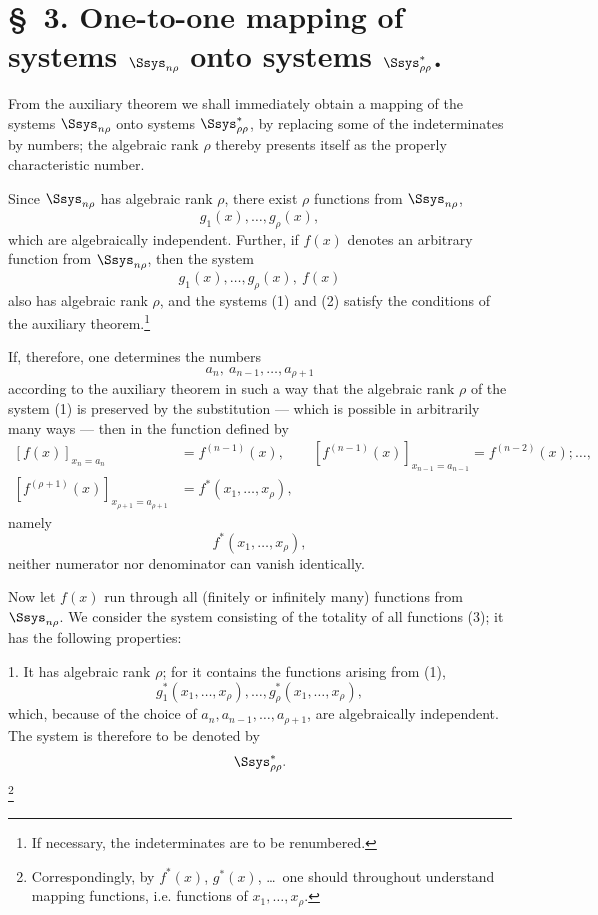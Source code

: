 \documentclass[11pt]{article}
\begin{document}
\section*{\S\ 3. One-to-one mapping of systems $\Ssys_{n\rho}$ onto systems $\Ssys^*_{\rho\rho}$.}

From the auxiliary theorem we shall immediately obtain a mapping of the systems $\Ssys_{n\rho}$ onto systems $\Ssys^*_{\rho\rho}$, by replacing some of the indeterminates by numbers; the algebraic rank $\rho$ thereby presents itself as the properly characteristic number.

Since $\Ssys_{n\rho}$ has algebraic rank $\rho$, there exist $\rho$ functions from $\Ssys_{n\rho}$,
\begin{equation}
  g_1(x),\ldots,g_\rho(x),
\tag{1}
\end{equation}
which are algebraically independent. Further, if $f(x)$ denotes an arbitrary function from $\Ssys_{n\rho}$, then the system
\begin{equation}
  g_1(x),\ldots,g_\rho(x),\ f(x)
\tag{2}
\end{equation}
also has algebraic rank $\rho$, and the systems (1) and (2) satisfy the conditions of the auxiliary theorem.\footnote{If necessary, the indeterminates are to be renumbered.}

If, therefore, one determines the numbers
\[
  a_n,\ a_{n-1},\ldots,a_{\rho+1}
\]
according to the auxiliary theorem in such a way that the algebraic rank $\rho$ of the system (1) is preserved by the substitution --- which is possible in arbitrarily many ways --- then in the function defined by
\[
\begin{aligned}
 [f(x)]_{x_n=a_n}&=f^{(n-1)}(x),\qquad
 [f^{(n-1)}(x)]_{x_{n-1}=a_{n-1}}=f^{(n-2)}(x);\ldots,\\
 [f^{(\rho+1)}(x)]_{x_{\rho+1}=a_{\rho+1}}&=f^*(x_1,\ldots,x_\rho),
\end{aligned}
\]
namely
\begin{equation}
  f^*(x_1,\ldots,x_\rho),
\tag{3}
\end{equation}
neither numerator nor denominator can vanish identically.

Now let $f(x)$ run through all (finitely or infinitely many) functions from $\Ssys_{n\rho}$. We consider the system consisting of the totality of all functions (3); it has the following properties:

1. It has algebraic rank $\rho$; for it contains the functions arising from (1),
\[
  g_1^*(x_1,\ldots,x_\rho),\ldots,g_\rho^*(x_1,\ldots,x_\rho),
\]
which, because of the choice of $a_n,a_{n-1},\ldots,a_{\rho+1}$, are algebraically independent. The system is therefore to be denoted by
\[
  \Ssys^*_{\rho\rho}.
\]
\footnote{Correspondingly, by $f^*(x)$, $g^*(x)$, \ldots\ one should throughout understand mapping functions, i.e. functions of $x_1,\ldots,x_\rho$.}
\end{document}
